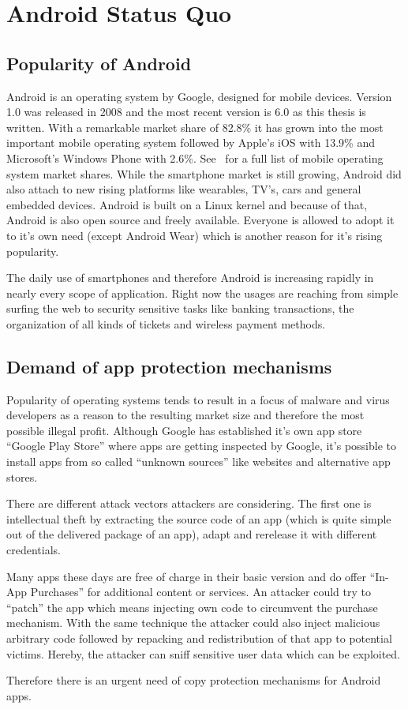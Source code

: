 \chapter{Android Status Quo}\label{chapter:android_status_quo}

\section{Popularity of Android}
Android is an operating system by Google,
designed for mobile devices. Version 1.0 was released
in 2008 and the most recent version is 6.0 as this thesis
is written. With a remarkable market share of 82.8\%
it has grown into the most important mobile operating system
followed by Apple's iOS with 13.9\% and Microsoft's Windows
Phone with 2.6\%. See~\parencite{marketshare} for a full list
of mobile operating system market shares. While the smartphone
market is still growing, Android did also attach to new
rising platforms like wearables, TV's, cars and general
embedded devices. Android is built on a Linux kernel
and because of that, Android is also open source and freely
available. Everyone is allowed to adopt it to it's own need
(except Android Wear) which is another reason for it's
rising popularity.

The daily use of smartphones and therefore Android is increasing
rapidly in nearly every scope of application. Right now the usages
are reaching from simple surfing the web to security sensitive tasks
like banking transactions, the organization of all kinds of tickets
and wireless payment methods.

\section{Demand of app protection mechanisms}
Popularity of operating systems tends to result in a focus of
malware and virus developers as a reason to the resulting market
size and therefore the most possible illegal profit.
Although Google has established it's own app store
``Google Play Store'' where apps are getting inspected by Google,
it's possible to install apps from so called ``unknown sources''
like websites and alternative app stores.

There are different attack vectors attackers are considering.
The first one is intellectual theft by extracting the source
code of an app (which is quite simple out of the delivered
package of an app), adapt and rerelease it with different credentials.


Many apps these days are free of charge in their basic version and
do offer ``In-App Purchases'' for additional content or services.
An attacker could try to ``patch'' the app which means
injecting own code to circumvent the purchase mechanism.
With the same technique the attacker could also inject malicious
arbitrary code followed by repacking and redistribution of that
app to potential victims. Hereby, the attacker can sniff
sensitive user data which can be exploited.

Therefore there is an urgent need of copy protection mechanisms
for Android apps.
